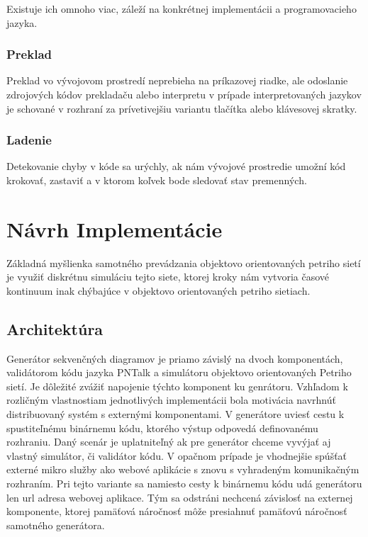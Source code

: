 	Existuje ich omnoho viac, záleží na konkrétnej implementácii a programovacieho jazyka.
	
	\subsection{Preklad}
	Preklad vo vývojovom prostredí neprebieha na príkazovej riadke, ale odoslanie zdrojových kódov prekladaču alebo interpretu v prípade interpretovaných jazykov je schované v rozhraní za prívetivejšiu variantu tlačítka alebo klávesovej skratky.
	
	\subsection{Ladenie}
	Detekovanie chyby v kóde sa urýchly, ak nám vývojové prostredie umožní kód krokovať, zastaviť a v ktorom koľvek bode sledovať stav premenných.



\chapter{Návrh Implementácie}

Základná myšlienka samotného prevádzania objektovo orientovaných petriho sietí je využiť diskrétnu simuláciu tejto siete, ktorej kroky nám vytvoria časové kontinuum inak chýbajúce v objektovo orientovaných petriho sietiach. 

\section{Architektúra}

Generátor sekvenčných diagramov\cite{Analysis2012} je priamo závislý na dvoch komponentách, validátorom kódu jazyka PNTalk a simulátoru objektovo orientovaných Petriho sietí. Je dôležité zvážiť napojenie týchto komponent ku genrátoru. Vzhľadom k rozličným vlastnostiam jednotlivých implementácii bola motivácia navrhnúť distribuovaný systém s externými komponentami. V generátore uviesť cestu k spustiteľnému binárnemu kódu, ktorého výstup odpovedá definovanému rozhraniu. Daný scenár je uplatniteľný ak pre generátor chceme vyvýjať aj vlastný simulátor, či validátor kódu. V opačnom prípade je vhodnejšie spúšťať externé mikro služby ako webové aplikácie s znovu s vyhradeným komunikačným rozhraním. Pri tejto variante sa namiesto cesty k binárnemu kódu udá generátoru len url adresa webovej aplikace. Tým sa odstráni nechcená závislosť na externej komponente, ktorej pamäťová náročnosť môže presiahnuť pamäťovú náročnosť samotného generátora.

